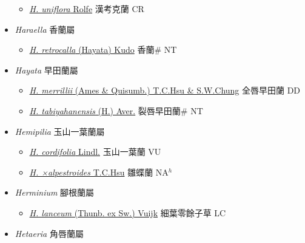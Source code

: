 \begin{itemize}
  \begin{itemize}
        \item[] \href{http://www.theplantlist.org/tpl1.1/search?q=Hancockia+uniflora}{\textit{H. uniflora} Rolfe}   漢考克蘭 CR
  \end{itemize}
 \item[] \textit{Haraella} 香蘭屬
                    
  \begin{itemize}
        \item[] \href{http://www.theplantlist.org/tpl1.1/search?q=Haraella+retrocalla}{\textit{H. retrocalla} (Hayata) Kudo}   香蘭\# NT
  \end{itemize}
 \item[] \textit{Hayata} 早田蘭屬
                    
  \begin{itemize}
        \item[] \href{http://www.theplantlist.org/tpl1.1/search?q=Hayata+merrillii}{\textit{H. merrillii} (Ames \& Quisumb.) T.C.Hsu \& S.W.Chung}   全唇早田蘭 DD
        \item[] \href{http://www.theplantlist.org/tpl1.1/search?q=Hayata+tabiyahanensis}{\textit{H. tabiyahanensis} (H.) Aver.}   裂唇早田蘭\# NT
  \end{itemize}
 \item[] \textit{Hemipilia} 玉山一葉蘭屬
                    
  \begin{itemize}
        \item[] \href{http://www.theplantlist.org/tpl1.1/search?q=Hemipilia+cordifolia}{\textit{H. cordifolia} Lindl.}   玉山一葉蘭 VU
        \item[] \href{http://www.theplantlist.org/tpl1.1/search?q=Hemipilia+×alpestroides}{\textit{H. ×alpestroides} T.C.Hsu}   雛蝶蘭 NA$^h$
  \end{itemize}
 \item[] \textit{Herminium} 腳根蘭屬
                    
  \begin{itemize}
        \item[] \href{http://www.theplantlist.org/tpl1.1/search?q=Herminium+lanceum}{\textit{H. lanceum} (Thunb. ex Sw.) Vuijk}   細葉零餘子草 LC
  \end{itemize}
 \item[] \textit{Hetaeria} 角唇蘭屬
                    

\end{itemize}
